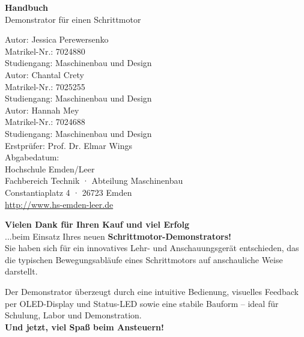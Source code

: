 \documentclass[a4paper,12pt]{report}
\begin{document}
	
	\begin{titlepage}
		\centering
		\vspace*{2cm}
		{\Huge \textbf{Handbuch}}\\[1.5cm]
		{\LARGE Demonstrator für einen Schrittmotor}\\[4cm]
		\begin{flushleft}
			\large
			Autor: Jessica Perewersenko\\
			Matrikel-Nr.: 7024880\\
			Studiengang: Maschinenbau und Design\\[1cm]
			
			Autor: Chantal Crety\\
			Matrikel-Nr.: 7025255\\
			Studiengang: Maschinenbau und Design\\[1cm]
			
			Autor: Hannah Mey\\
			Matrikel-Nr.: 7024688\\
			Studiengang: Maschinenbau und Design\\[1.5cm]
			
			
			Erstprüfer: Prof. Dr. Elmar Wings\\
			Abgabedatum: \\[1.5cm]
			
			Hochschule Emden/Leer\\
			Fachbereich Technik · Abteilung Maschinenbau\\
			Constantiaplatz 4 · 26723 Emden\\
			\url{http://www.hs-emden-leer.de}
		\end{flushleft}
	\end{titlepage}
	
		\vspace*{\fill}
		\begin{center}
		\begin{tcolorbox}[
					colback=white!95!gray,
					colframe=black,
					width=0.9\textwidth,
					boxrule=0.5mm,
					arc=2mm,
					auto outer arc,
					drop shadow
					]
  	\textbf{Vielen Dank für Ihren Kauf und viel Erfolg} \\
    ...beim Einsatz Ihres neuen \textbf{Schrittmotor-Demonstrators!}\\[1em]

    Sie haben sich für ein innovatives Lehr- und Anschauungsgerät entschieden, das die typischen Bewegungsabläufe eines Schrittmotors auf anschauliche Weise darstellt.  

    Der Demonstrator überzeugt durch eine intuitive Bedienung, visuelles Feedback per OLED-Display und Status-LED sowie eine stabile Bauform – ideal für Schulung, Labor und Demonstration.\\

    \medskip
    \centering
    \textbf{Und jetzt, viel Spaß beim Ansteuern!}
    \end{tcolorbox}
    \end{center}
    \vspace*{\fill}
	
\end{document}
